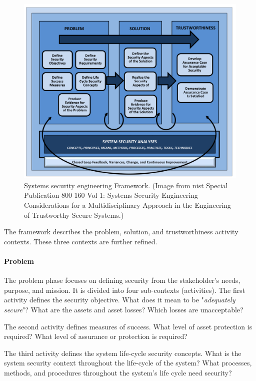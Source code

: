 \documentclass[../../main/main.tex]{subfiles}
\begin{document}
\begin{figure}[h]
\includegraphics[width=\linewidth]{../figures/sseframework}
\caption{\label{sseframework}Systems security engineering Framework. (Image from \gls{nist} Special Publication 800-160 Vol 1: Systems Security Engineering Considerations for a Multidisciplinary Approach in the Engineering of Trustworthy Secure Systems.\cite{NIST800160})}
\end{figure}

The framework describes the problem, solution, and trustworthiness activity contexts.  These three contexts are further refined. 
\paragraph*{Problem}
The problem phase focuses on defining security from the stakeholder's needs, purpose, and mission.  It is divided into four sub-contexts (activities).  The first activity defines the security objective. What does it mean to be "\textit{adequately secure}"?   What are the assets and asset losses?  Which losses are unacceptable?
 
The second activity defines measures of success.  What level of asset protection is required?  What level of assurance or protection is required?  

The third activity defines the system life-cycle security concepts.  What is the system security context throughout the life-cycle of the system?  What processes, methods, and procedures throughout the system's life cycle need security?  
\end{document}
